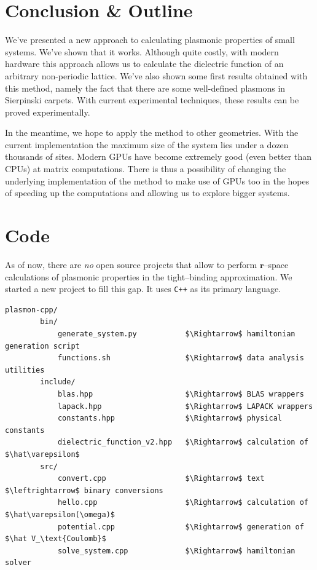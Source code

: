 \documentclass[a4paper,12pt]{article}
\begin{document}
\newpage
\section{Conclusion \& Outline}
    
    We've presented a new approach to calculating plasmonic properties of small systems. We've shown that it works. Although quite costly, with modern hardware this approach allows us to calculate the dielectric function of an arbitrary non-periodic lattice. We've also shown some first results obtained with this method, namely the fact that there are some well-defined plasmons in Sierpinski carpets. With current experimental techniques, these results can be proved experimentally.

    In the meantime, we hope to apply the method to other geometries. With the current implementation the maximum size of the system lies under a dozen thousands of sites. Modern GPUs have become extremely good (even better than CPUs) at matrix computations. There is thus a possibility of changing the underlying implementation of the method to make use of GPUs too in the hopes of speeding up the computations and allowing us to explore bigger systems.

\newpage
\appendix

\section{Code}
\label{code}

    As of now, there are \textit{no} open source projects that allow to perform $\mathbf{r}$--space calculations of plasmonic properties in the tight--binding approximation. We started a new project \cite{plasmon-cpp} to fill this gap. It uses \texttt{C++} as its primary language.

\begin{lstlisting}[mathescape]
    plasmon-cpp/
        bin/
            generate_system.py           $\Rightarrow$ hamiltonian generation script
            functions.sh                 $\Rightarrow$ data analysis utilities
        include/
            blas.hpp                     $\Rightarrow$ BLAS wrappers
            lapack.hpp                   $\Rightarrow$ LAPACK wrappers
            constants.hpp                $\Rightarrow$ physical constants
            dielectric_function_v2.hpp   $\Rightarrow$ calculation of $\hat\varepsilon$
        src/
            convert.cpp                  $\Rightarrow$ text $\leftrightarrow$ binary conversions
            hello.cpp                    $\Rightarrow$ calculation of $\hat\varepsilon(\omega)$
            potential.cpp                $\Rightarrow$ generation of $\hat V_\text{Coulomb}$
            solve_system.cpp             $\Rightarrow$ hamiltonian solver
\end{lstlisting}
\end{document}
